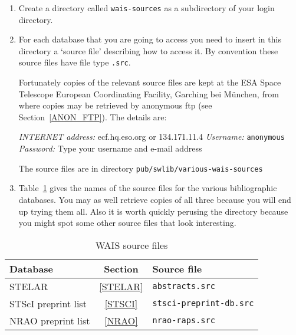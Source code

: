 \documentclass[twoside,11pt,nolof]{starlink}
\begin{document}
\begin{enumerate}

  \item Create a directory called \texttt{wais-sources} as a subdirectory
   of your login directory.

  \item For each database that you are going to access you need to
   insert in this directory a `source file' describing how to access
   it. By convention these source files have file type \texttt{.src}.

   Fortunately copies of the relevant source files are kept at the ESA
   Space Telescope European Coordinating Facility, Garching bei
   M\"{u}nchen, from where copies may be retrieved by anonymous ftp
   (see Section~\ref{ANON_FTP}). The details are:

   \textit{INTERNET address:} ecf.hq.eso.org  or 134.171.11.4
   \newline \textit{Username:} \verb-anonymous-
   \newline \textit{Password:} Type your username and e-mail address

   The source files are in directory \texttt{pub/swlib/various-wais-sources}

  \item Table~\ref{WAIS_SOURCE} gives the names of the source files
   for the various bibliographic databases. You may as well retrieve
   copies of all three because you will end up trying them all. Also
   it is worth quickly perusing the directory because you might spot
   some other source files that look interesting.

\end{enumerate}

\begin{table}[htbp]

\begin{center}
\begin{tabular}{lcl}
Database            &  Section      & Source file \\   \hline
STELAR              & \ref{STELAR}  & \texttt{abstracts.src} \\
STScI preprint list & \ref{STSCI}   & \texttt{stsci-preprint-db.src} \\
NRAO preprint list  & \ref{NRAO}    & \texttt{nrao-raps.src} \\
\end{tabular}
\end{center}

\caption{WAIS source files}
\label{WAIS_SOURCE}

\end{table}
\end{document}
